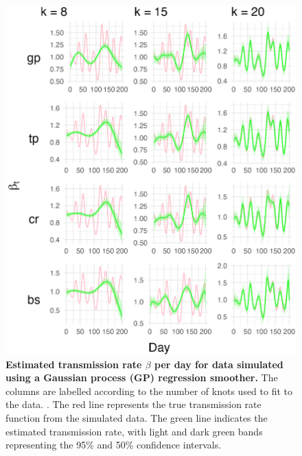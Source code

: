 \documentclass[
11pt, %
oneside, %
english, %
singlespacing, %
]{macthesis} %
\begin{document}
\begin{figure}[H]
\centering
\includegraphics[width=\textwidth]{figure/Simulated/unaggregated/simulation_gp_20_k(5,10,20)_bsd1_beta1_plot_beta.png}
\caption[Estimated Simulated Data (GP) Transmission Rate]{\textbf{Estimated transmission rate \(\beta\) per day for data simulated using a Gaussian process (GP) regression smoother.} The columns are labelled according to the number of knots used to fit to the data. . The red line represents the true transmission rate function from the simulated data. The green line indicates the estimated transmission rate, with light and dark green bands representing the 95\% and 50\% confidence intervals.}
\label{fig:transmission20gp}
\end{figure}
\end{document}
